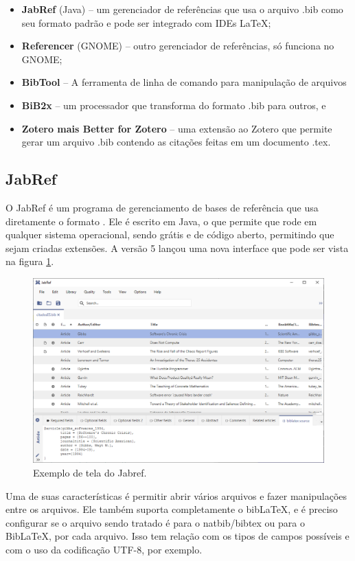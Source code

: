 \begin{itemize}
    \item \textbf{JabRef} (Java) -- um gerenciador de referências que usa o arquivo .bib como seu formato padrão e pode ser integrado com IDEs \LaTeX;
    \item \textbf{Referencer} (GNOME) -- outro gerenciador de referências, só funciona no GNOME;
    \item \textbf{BibTool} -- A ferramenta de linha de comando para manipulação de arquivos 
    \item \textbf{BiB2x}  -- um processador que transforma do formato .bib para outros, e
    \item \textbf{Zotero mais Better  for Zotero} -- uma extensão ao Zotero que permite gerar um arquivo .bib contendo as citações feitas em um documento .tex.
\end{itemize}


\subsection{JabRef}
O JabRef é um programa de gerenciamento de bases de referência que usa diretamente o formato . Ele é escrito em Java, o que permite que rode em qualquer sistema operacional, sendo grátis e de código aberto, permitindo que sejam criadas extensões. A versão 5 lançou uma nova interface que pode ser vista na figura \ref{fig:jabref}.

\begin{figure}[hbt]
    \centering
    \includegraphics[width=0.7\linewidth]{Images/jabref}
    \caption{Exemplo de tela do Jabref.}
    \label{fig:jabref}
\end{figure}  


Uma de suas características é permitir abrir vários arquivos e fazer manipulações entre os arquivos. Ele também suporta completamente o bibLaTeX, e é preciso configurar se o arquivo sendo tratado é para o natbib/bibtex ou para o BibLaTeX, por cada arquivo. Isso tem relação com os tipos de campos possíveis e com o uso da codificação UTF-8, por exemplo.

